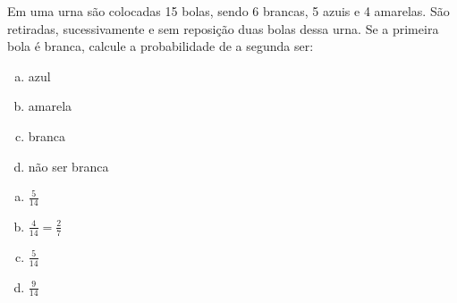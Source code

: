 \begin{ex}
  Em uma urna são colocadas 15 bolas, sendo 6 brancas, 5 azuis e 4 amarelas. São retiradas, sucessivamente e sem reposição duas bolas dessa urna. Se a  primeira bola é branca, calcule a probabilidade de a segunda ser:
    \begin{enumerate}[(a)]
    \item azul
    \item amarela
    \item branca
    \item não ser branca
    \end{enumerate}
      \begin{sol}
       \phantom{A}  
       \begin{enumerate}  [(a)]
           \item $\frac{5}{14}$
           \item $\frac{4}{14}=\frac{2}{7}$
           \item $\frac{5}{14}$
           \item $\frac{9}{14}$
       \end{enumerate}
      \end{sol}
\end{ex}